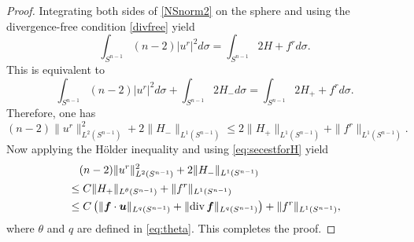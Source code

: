 \documentclass[12pt]{amsart}
\renewcommand{\div}{{\rm div \thinspace }}
\newcommand{\Bu}{{\boldsymbol{u}}}
\newcommand{\Bf}{{\boldsymbol{f}}}
\begin{document}
	\begin{proof}
		Integrating both sides of \eqref{NSnorm2} on the sphere and using the divergence-free condition \eqref{divfree} yield 
		\begin{equation*}
			\int_{S^{n-1}} (n-2)|u^r|^2 d\sigma = \int_{S^{n-1}} 2H + f^{r} d\sigma.
		\end{equation*}
		This is equivalent to 
		\begin{equation}\label{eq:ridalest}
			\int_{S^{n-1}} (n-2)|u^r|^2 d\sigma + \int_{S^{n-1}} 2H_- d \sigma = \int_{S^{n-1}} 2H_+ + f^{r} d\sigma.
		\end{equation}
		Therefore, one has
		\begin{equation}\label{eq:L2estur}
			(n-2)\|u^r\|_{L^2(S^{n-1})}^2 + 2\|H_-\|_{L^1(S^{n-1})} \leq 2\|H_+\|_{L^1(S^{n-1})} + \|f^r\|_{L^1(S^{n-1})} . 
		\end{equation}
		Now applying  the H\"older inequality and using \eqref{eq:secestforH} yield
		\begin{equation*}
			\begin{aligned}
				&\quad (n-2)\|u^r\|_{L^2(S^{n-1})}^2 + 2\|H_-\|_{L^1(S^{n-1})} \\
				&\leq C	\|H_+\|_{L^{\theta}(S^{n-1})} +  \|f^r\|_{L^1(S^{n-1})} \\
				&\leq C\left( \|\Bf\cdot \Bu\|_{L^q(S^{n-1})} + \|\div \Bf\|_{L^q(S^{n-1})} \right) +  \|f^r\|_{L^1(S^{n-1})},
			\end{aligned}
		\end{equation*}
		where $\theta$ and $q$ are defined in \eqref{eq:theta}.
		This completes the proof.
	\end{proof}
	
\end{document}
